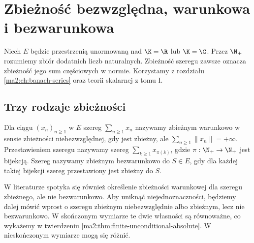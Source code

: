 \chapter{Zbieżność bezwzględna, warunkowa i bezwarunkowa}
\label{ma2:ch:unconditional-series}

Niech $E$ będzie przestrzenią unormowaną nad $\K=\R$ lub
$\K=\C$. Przez $\N_+$ rozumiemy zbiór dodatnich liczb
naturalnych.
Zbieżność szeregu zawsze oznacza zbieżność jego sum
częściowych w normie. Korzystamy z rozdziału
\ref{ma2:ch:banach-series} oraz teorii skalarnej z tomu I.

\section{Trzy rodzaje zbieżności}
\begin{definicja}
\label{ma2:def:unconditional-series}
Dla ciągu $(x_n)_{n\ge1}$ w $E$ szereg $\sum_{n\ge1}x_n$
nazywamy zbieżnym warunkowo
w sensie zbieżności niebezwzględnej, gdy jest zbieżny,
ale $\sum_{n\ge1}\|x_n\|=+\infty$.
Przestawieniem szeregu nazywamy szereg
$\sum_{k\ge1}x_{\pi(k)}$, gdzie $\pi:\N_+\to\N_+$
jest bijekcją.
Szereg nazywamy zbieżnym bezwarunkowo do $S\in E$,
gdy dla każdej takiej bijekcji szereg przestawiony
jest zbieżny do $S$.
\end{definicja}
W literaturze spotyka się również określenie zbieżności
warunkowej dla szeregu zbieżnego, ale nie bezwarunkowo.
Aby uniknąć niejednoznaczności, będziemy dalej mówić
wprost o szeregu zbieżnym niebezwzględnie albo
zbieżnym, lecz nie bezwarunkowo. W skończonym wymiarze
te dwie własności są równoważne, co wykażemy w
twierdzeniu \ref{ma2:thm:finite-unconditional-absolute}.
W nieskończonym wymiarze mogą się różnić.

